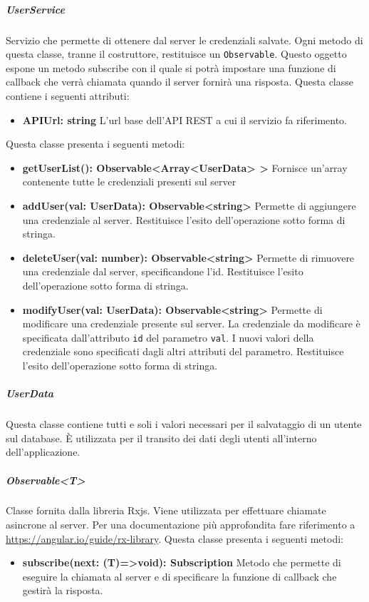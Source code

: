 \subparagraph{UserService}
Servizio che permette di ottenere dal server le credenziali salvate. Ogni metodo di questa classe, tranne il costruttore, restituisce un \texttt{Observable}. Questo oggetto espone un metodo subscribe con il quale si potrà impostare una funzione di callback che verrà chiamata quando il server fornirà una risposta. \newline
Questa classe contiene i seguenti attributi:
\begin{itemize}
	\item \textbf{APIUrl: string}
	L'url base dell'API REST a cui il servizio fa riferimento.
\end{itemize}
Questa classe presenta i seguenti metodi:
\begin{itemize}
	\item \textbf{getUserList(): Observable<Array<UserData> >} \newline
	Fornisce un'array contenente tutte le credenziali presenti sul server
	\item \textbf{addUser(val: UserData): Observable<string>} \newline
	Permette di aggiungere una credenziale al server. Restituisce l'esito dell'operazione sotto forma di stringa.
	\item \textbf{deleteUser(val: number): Observable<string>} \newline
	Permette di rimuovere una credenziale dal server, specificandone l'id. Restituisce l'esito dell'operazione sotto forma di stringa.
	\item \textbf{modifyUser(val: UserData): Observable<string>} \newline
	Permette di modificare una credenziale presente sul server. La credenziale da modificare è specificata dall'attributo \texttt{id} del parametro \texttt{val}. I nuovi valori della credenziale sono specificati dagli altri attributi del parametro. Restituisce l'esito dell'operazione sotto forma di stringa.
\end{itemize}
\subparagraph{UserData}
Questa classe contiene tutti e soli i valori necessari per il salvataggio di un utente sul database. È utilizzata per il transito dei dati degli utenti all'interno dell'applicazione. \newline
\subparagraph{Observable<T>}
Classe fornita dalla libreria Rxjs. Viene utilizzata per effettuare chiamate asincrone al server. Per una documentazione più approfondita fare riferimento a \url{https://angular.io/guide/rx-library}. \newline
Questa classe presenta i seguenti metodi:
\begin{itemize}
	\item \textbf{subscribe(next: (T)=>void): Subscription} \newline
	Metodo che permette di eseguire la chiamata al server e di specificare la funzione di callback che gestirà la risposta.
\end{itemize}

